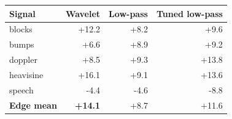 \begin{tabular}{lrrr}
\toprule
Signal & Wavelet & Low-pass & Tuned low-pass \\
\midrule
blocks & +12.2 & +8.2 & +9.6 \\
bumps & +6.6 & +8.9 & +9.2 \\
doppler & +8.5 & +9.3 & +13.8 \\
heavisine & +16.1 & +9.1 & +13.6 \\
speech & -4.4 & -4.6 & -8.8 \\
\midrule
\textbf{Edge mean} & \textbf{+14.1} & +8.7 & +11.6 \\
\bottomrule
\end{tabular}
